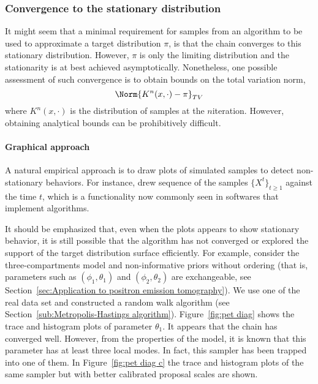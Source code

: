 \subsubsection{Convergence to the stationary distribution}
\label{ssub:Convergence to the stationary distribution}

It might seem that a minimal requirement for samples from an \mcmc algorithm to be used to approximate a target distribution $\pi$, is that the chain converges to this stationary distribution. However, $\pi$ is only the limiting distribution and the stationarity is at best achieved asymptotically. Nonetheless, one possible assessment of such convergence is to obtain bounds on the total variation norm,
\begin{equation*}
  \Norm{K^n(x,\cdot)-\pi}_{TV}
\end{equation*}
where $K^n(x,\cdot)$ is the distribution of samples at the $n$\xth iteration. However, obtaining analytical bounds can be prohibitively difficult.

\paragraph{Graphical approach}

A natural empirical approach is to draw plots of simulated samples to detect non-stationary behaviors. For instance, \cite{Gelfand:1990it} drew sequence of the samples $\{X^t\}_{t\ge1}$ against the time $t$, which is a functionality now commonly seen in softwares that implement \mcmc algorithms.

It should be emphasized that, even when the plots appears to show stationary behavior, it is still possible that the algorithm has not converged or explored the support of the target distribution surface efficiently. For example, consider the three-compartments \pet model and non-informative priors without ordering (that is, parameters such as $(\phi_1,\theta_1)$ and $(\phi_2,\theta_2)$ are exchangeable, see Section~\ref{sec:Application to positron emission tomography}). We use one of the real data set and constructed a random walk algorithm (see Section~\ref{sub:Metropolis-Hastings algorithm}). Figure~\ref{fig:pet diag} shows the trace and histogram plots of parameter $\theta_1$. It appears that the \mcmc chain has converged well. However, from the properties of the model, it is known that this parameter has at least three local modes. In fact, this sampler has been trapped into one of them. In Figure~\ref{fig:pet diag c} the trace and histogram plots of the same sampler but with better calibrated proposal scales are shown.

